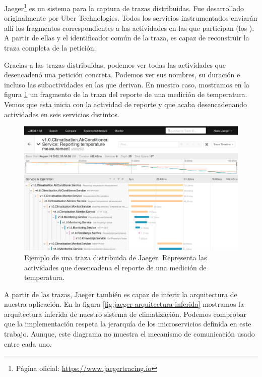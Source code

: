 Jaeger\footnote{Página oficial: \url{https://www.jaegertracing.io}} es un sistema para la captura de trazas distribuidas. Fue desarrollado originalmente por Uber Technologies. Todos los servicios instrumentados enviarán allí los fragmentos correspondientes a las actividades en las que participan (los ). A partir de ellas y el identificador común de la traza, es capaz de reconstruir la traza completa de la petición.

Gracias a las trazas distribuidas, podemos ver todas las actividades que desencadenó una petición concreta. Podemos ver sus nombres, su duración e incluso las subactividades en las que derivan. En nuestro caso, mostramos en la figura \ref{fig:jaeger-traza-distribuida} un fragmento de la traza del reporte de una medición de temperatura. Vemos que esta inicia con la actividad de reporte y que acaba desencadenando actividades en seis servicios distintos.

\begin{figure}[htb]
  \centering
  \includegraphics[scale=0.35]{cap_despliegue/images/jaeger-traza-distribuida}
  \caption{Ejemplo de una traza distribuida de Jaeger. Representa las actividades que desencadena el reporte de una medición de temperatura.}
  \label{fig:jaeger-traza-distribuida}
\end{figure}

A partir de las trazas, Jaeger también es capaz de inferir la arquitectura de nuestra aplicación. En la figura \ref{fig:jaeger-arquitectura-inferida} mostramos la arquitectura inferida de nuestro sistema de climatización. Podemos comprobar que la implementación respeta la jerarquía de los microservicios definida en este trabajo. Aunque, este diagrama no muestra el mecanismo de comunicación usado entre cada uno.

